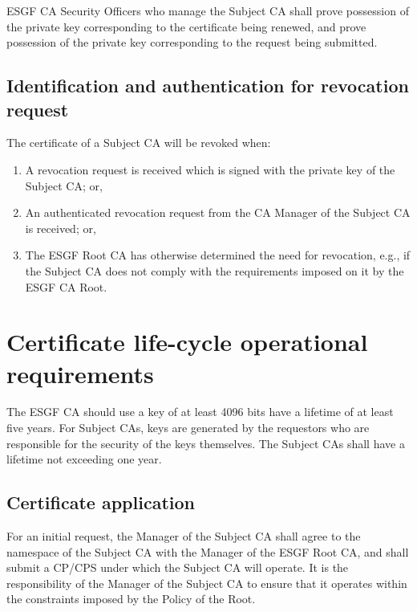 ESGF CA Security Officers who manage the Subject CA shall prove
possession of the private key corresponding to the certificate being
renewed, and prove possession of the private key corresponding to the
request being submitted.

\subsection{Identification and authentication for revocation request}\label{identification-and-authentication-for-revocation-request}

The certificate of a Subject CA will be revoked when:

\begin{enumerate}
\item
  
  A revocation request is received which is signed with the private key
  of the Subject CA; or,
  
\item
  
  An authenticated revocation request from the CA Manager of the Subject
  CA is received; or,
  
\item
  
  The ESGF Root CA has otherwise determined the need for revocation,
  e.g., if the Subject CA does not comply with the requirements imposed
  on it by the ESGF CA Root.
  
\end{enumerate}

\section{Certificate life-cycle operational requirements}\label{certificate-life-cycle-operational-requirements}

The ESGF CA should use a key of at least 4096 bits have a lifetime of at least five years. For Subject CAs, keys are generated by the requestors who are responsible for the security of the keys themselves. The Subject CAs shall have a lifetime not exceeding one year.

\subsection{Certificate application}\label{certificate-application}

For an initial request, the Manager of the Subject CA shall agree to the
namespace of the Subject CA with the Manager of the ESGF Root CA,
and shall submit a CP/CPS under which the Subject CA will operate. It is
the responsibility of the Manager of the Subject CA to ensure that it
operates within the constraints imposed by the Policy of the Root. 

